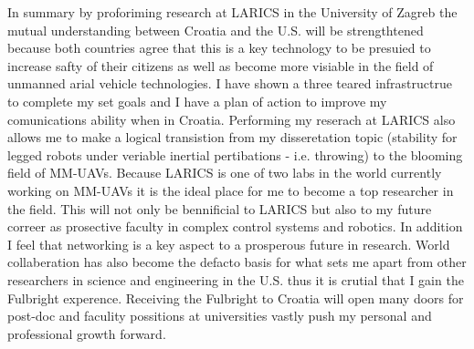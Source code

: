 \documentclass[12pt]{article}
\begin{document}
In summary by proforiming research at LARICS in the University of Zagreb the mutual understanding between Croatia and the U.S. will be strengthtened because both countries agree that this is a key technology to be presuied to increase safty of their citizens as well as become more visiable in the field of unmanned arial vehicle technologies.  
I have shown a three teared infrastructrue to complete my set goals and I have a plan of action to improve my comunications ability when in Croatia.
Performing my reserach at LARICS also allows me to make a logical transistion from my disseretation topic (stability for legged robots under veriable inertial pertibations - i.e. throwing) to the blooming field of MM-UAVs.  
Because LARICS is one of two labs in the world currently working on MM-UAVs it is the ideal place for me to become  a top researcher in the field.  
This will not only be bennificial to LARICS but also to my future correer as prosective faculty in complex control systems and robotics.
In addition I feel that networking is a key aspect to a prosperous future in research.
World collaberation has also become the defacto basis for what sets me apart from other researchers in science and engineering in the U.S. thus it is crutial that I gain the Fulbright experence.
Receiving the Fulbright to Croatia will open many doors for post-doc and faculity possitions at universities vastly push my personal and professional growth forward.
\end{document}
